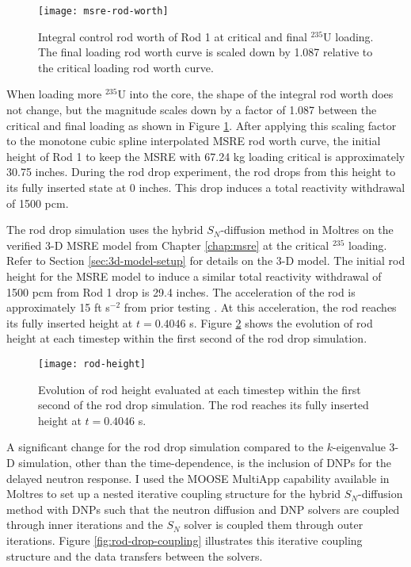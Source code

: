 \begin{figure}[t]
  \centering
  \texttt{[image: msre-rod-worth]}
  \caption{Integral control rod worth of Rod 1 \cite{prince_zero-power_1968} at critical and final
  $^{235}$U loading. The final loading rod worth curve is scaled down by 1.087 relative to the
  critical loading rod worth curve.}
  \label{fig:msre-rod-worth-2}
\end{figure}

When loading more $^{235}$U into the core, the shape of the integral rod worth does not change,
but the magnitude scales down by a factor of 1.087 between the critical and final loading
as shown in Figure \ref{fig:msre-rod-worth-2}. After applying this scaling factor to the monotone cubic
spline interpolated \gls{MSRE} rod worth curve, the initial height of Rod 1 to keep the \gls{MSRE}
with 67.24 kg loading critical is approximately 30.75 inches. During the rod drop experiment, the rod
drops from this height to its fully inserted state at 0 inches. This drop induces a total
reactivity withdrawal of 1500 pcm.

The rod drop simulation uses the hybrid $S_N$-diffusion method in Moltres on the verified 3-D
\gls{MSRE} model from Chapter
\ref{chap:msre} at the critical $^{235}$ loading. Refer to Section \ref{sec:3d-model-setup} for
details on the 3-D model. The initial rod height for the \gls{MSRE} model to induce a similar total
reactivity withdrawal of 1500 pcm from Rod 1 drop is 29.4 inches. The acceleration of the
rod is approximately 15 ft s$^{-2}$ from prior testing \cite{prince_zero-power_1968}. At this
acceleration, the rod reaches its fully inserted height at $t=0.4046$ s. Figure \ref{fig:rod-height}
shows the evolution of rod height at each timestep within the first second of the rod drop simulation.

\begin{figure}[htb!]
  \centering
  \texttt{[image: rod-height]}
  \caption{Evolution of rod height evaluated at each timestep within the first second of the rod
  drop simulation. The rod reaches its fully inserted height at $t=0.4046$ s.}
  \label{fig:rod-height}
\end{figure}

A significant change for the rod drop simulation compared to the $k$-eigenvalue 3-D simulation,
other than the time-dependence, is the inclusion of \glspl{DNP} for the delayed neutron response.
I used the \gls{MOOSE} MultiApp capability available in Moltres to set up a nested iterative
coupling structure for the hybrid
$S_N$-diffusion method with \glspl{DNP} such that the neutron diffusion and \gls{DNP} solvers are
coupled through inner iterations and the $S_N$ solver is coupled them through outer iterations.
Figure \ref{fig:rod-drop-coupling} illustrates this iterative coupling structure and the data
transfers between the solvers.


